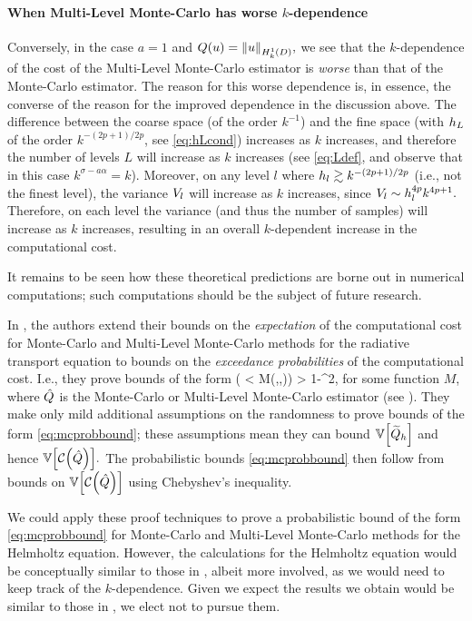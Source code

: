 \paragraph{When Multi-Level Monte-Carlo has worse $k$-dependence} Conversely, in the case  $a=1$ and $Q(u) = \NHokD{u},$ we see that the $k$-dependence of the cost of the Multi-Level Monte-Carlo estimator is \emph{worse} than that of the Monte-Carlo estimator. The reason for this worse dependence is, in essence, the converse of the reason for the improved dependence in the discussion above. The difference between the coarse space (of the order $k^{-1}$) and the fine space (with $h_{L}$ of the order $k^{-(2p+1)/2p}$, see \cref{eq:hLcond}) increases as $k$ increases, and therefore the number of levels $L$ will increase as $k$ increases (see \cref{eq:Ldef}, and observe that in this case $k^{\sigma - a\alpha} = k$). Moreover, on any level $l$ where $h_{l} \gtrsim k^{-(2p+1)/2p}$ (i.e., not the finest level), the variance $V_{l}$ will increase as $k$ increases, since $V_{l} \sim h_{l}^{4p}k^{4p+1}.$ Therefore, on each level the variance (and thus the number of samples) will increase as $k$ increases, resulting in an overall $k$-dependent increase in the computational cost.

It remains to be seen how these theoretical predictions are borne out in numerical computations; such computations should be the subject of future research.


In \cite{GrPaSc:19}, the authors extend their bounds on the \emph{expectation} of the computational cost for Monte-Carlo and Multi-Level Monte-Carlo methods for the radiative transport equation to bounds on the \emph{exceedance probabilities} of the computational cost. I.e., they prove bounds of the form
\beq\label{eq:mcprobbound}
\PP\mleft(\Cost{\Qhat} < M(\eps,\delta,\Qhat)\mright) > 1-\delta^2,
\eeq
for some function $M$, where $\hat{Q}$ is the Monte-Carlo or Multi-Level Monte-Carlo estimator (see \cite[Theorems 5.12 and 5.13]{GrPaSc:19}). They make only mild additional assumptions on the randomness to prove bounds of the form \cref{eq:mcprobbound}; these assumptions mean they can bound $\VAR{\Qhtilde}$ and hence $\VAR{\Cost{\Qhat}}.$ The probabilistic bounds \cref{eq:mcprobbound} then follow from bounds on $\VAR{\Cost{\Qhat}}$ using Chebyshev's inequality.

We could apply these proof techniques to prove a probabilistic bound of the form \cref{eq:mcprobbound} for Monte-Carlo and Multi-Level Monte-Carlo methods for the Helmholtz equation. However, the calculations for the Helmholtz equation would be conceptually similar to those in \cite{GrPaSc:19}, albeit more involved, as we would need to keep track of the $k$-dependence. Given we expect the results we obtain would be similar to those in \cite{GrPaSc:19}, we elect not to pursue them.
\ere
